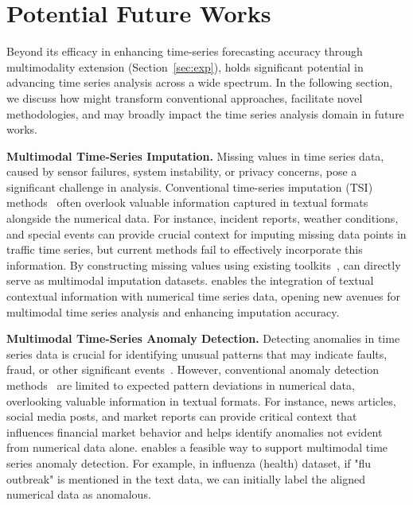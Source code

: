 \section{Potential Future Works}
Beyond its efficacy in enhancing time-series forecasting accuracy through multimodality extension (Section~\ref{sec:exp}), \model holds significant potential in advancing time series analysis across a wide spectrum. In the following section, we discuss how \model might transform conventional approaches, facilitate novel methodologies, and may broadly impact the time series analysis domain in future works.
\par\noindent\textbf{Multimodal Time-Series Imputation.} Missing values in time series data, caused by sensor failures, system instability, or privacy concerns, pose a significant challenge in analysis. Conventional time-series imputation (TSI) methods~\cite{che2018recurrent, fortuin2020gp, bansal2021missing, bilovs2023modeling} often overlook valuable information captured in textual formats alongside the numerical data. For instance, incident reports, weather conditions, and special events can provide crucial context for imputing missing data points in traffic time series, but current methods fail to effectively incorporate this information. By constructing missing values using existing toolkits~\cite{du2024tsi}, \model can directly serve as multimodal imputation datasets. \model enables the integration of textual contextual information with numerical time series data, opening new avenues for multimodal time series analysis and enhancing imputation accuracy.

\par\noindent\textbf{Multimodal Time-Series Anomaly Detection.} Detecting anomalies in time series data is crucial for identifying unusual patterns that may indicate faults, fraud, or other significant events~\cite{cook2019anomaly, blazquez2021review, zhang2024self}. However, conventional anomaly detection methods~\cite{munir2018deepant, carreno2020analyzing, xu2021anomaly, shen2020timeseries} are limited to expected pattern deviations in numerical data, overlooking valuable information in textual formats. For instance, news articles, social media posts, and market reports can provide critical context that influences financial market behavior and helps identify anomalies not evident from numerical data alone. \model enables a feasible way to support multimodal time series anomaly detection. For example, in influenza (health) dataset, if "flu outbreak" is mentioned in the text data, we can initially label the aligned numerical data as anomalous.

